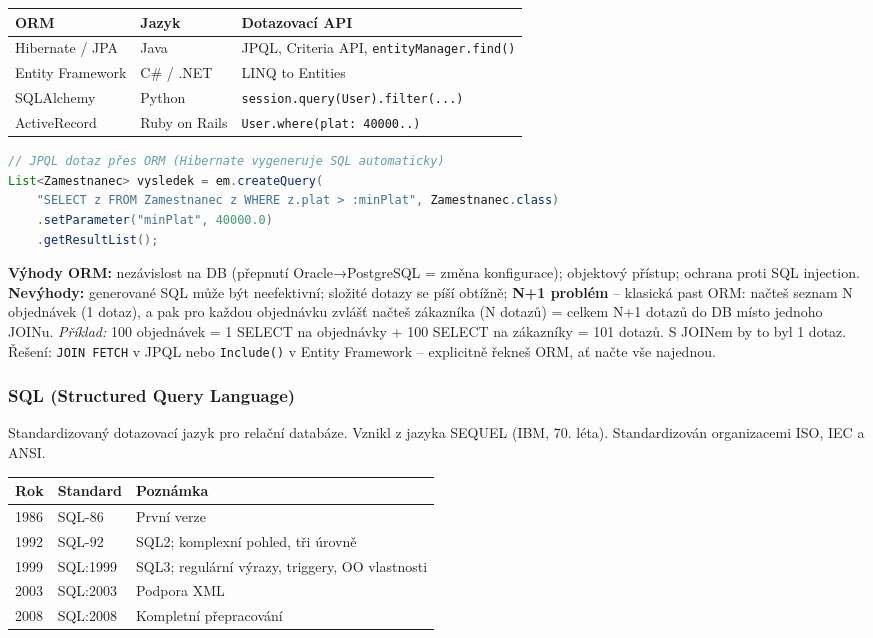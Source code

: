 \begin{center}
\begin{tabular}{lll}
\toprule
\textbf{ORM} & \textbf{Jazyk} & \textbf{Dotazovací API} \\
\midrule
Hibernate / JPA & Java & JPQL, Criteria API, \texttt{entityManager.find()} \\
Entity Framework & C\# / .NET & LINQ to Entities \\
SQLAlchemy & Python & \texttt{session.query(User).filter(...)} \\
ActiveRecord & Ruby on Rails & \texttt{User.where(plat: 40000..)} \\
\bottomrule
\end{tabular}
\end{center}

\begin{lstlisting}[language=Java, caption=JPA -- dotaz bez psaní SQL]
// JPQL dotaz přes ORM (Hibernate vygeneruje SQL automaticky)
List<Zamestnanec> vysledek = em.createQuery(
    "SELECT z FROM Zamestnanec z WHERE z.plat > :minPlat", Zamestnanec.class)
    .setParameter("minPlat", 40000.0)
    .getResultList();
\end{lstlisting}

\textbf{Výhody ORM:} nezávislost na DB (přepnutí Oracle→PostgreSQL = změna konfigurace);
objektový přístup; ochrana proti SQL injection. \textbf{Nevýhody:} generované SQL může být
neefektivní; složité dotazy se píší obtížně; \textbf{N+1 problém} -- klasická past ORM:
načteš seznam N objednávek (1 dotaz), a pak pro každou objednávku zvlášť načteš zákazníka
(N dotazů) = celkem N+1 dotazů do DB místo jednoho JOINu.
\textit{Příklad:} 100 objednávek = 1 SELECT na objednávky + 100 SELECT na zákazníky = 101 dotazů.
S JOINem by to byl 1 dotaz. Řešení: \texttt{JOIN FETCH} v JPQL nebo \texttt{Include()} v Entity Framework -- explicitně řekneš ORM, ať načte vše najednou.

\subsubsection{SQL (Structured Query Language)}

Standardizovaný dotazovací jazyk pro relační databáze. Vznikl z jazyka SEQUEL (IBM, 70. léta).
Standardizován organizacemi ISO, IEC a ANSI.

\begin{center}
\begin{tabular}{lll}
\toprule
\textbf{Rok} & \textbf{Standard} & \textbf{Poznámka} \\
\midrule
1986 & SQL-86 & První verze \\
1992 & SQL-92 & SQL2; komplexní pohled, tři úrovně \\
1999 & SQL:1999 & SQL3; regulární výrazy, triggery, OO vlastnosti \\
2003 & SQL:2003 & Podpora XML \\
2008 & SQL:2008 & Kompletní přepracování \\
\bottomrule
\end{tabular}
\end{center}

